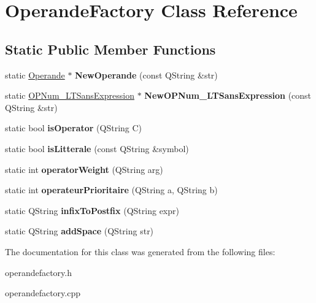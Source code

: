 \hypertarget{class_operande_factory}{}\section{Operande\+Factory Class Reference}
\label{class_operande_factory}
\subsection*{Static Public Member Functions}
\begin{DoxyCompactItemize}
\item 
static \hyperlink{class_operande}{Operande} $\ast$ {\bfseries New\+Operande} (const Q\+String \&str)\hypertarget{class_operande_factory_af20bfb7436b73504423a0b566c6aac5f}{}\label{class_operande_factory_af20bfb7436b73504423a0b566c6aac5f}

\item 
static \hyperlink{class_o_p_num___l_t_sans_expression}{O\+P\+Num\+\_\+\+L\+T\+Sans\+Expression} $\ast$ {\bfseries New\+O\+P\+Num\+\_\+\+L\+T\+Sans\+Expression} (const Q\+String \&str)\hypertarget{class_operande_factory_a6de4539897981c388493689aacacf548}{}\label{class_operande_factory_a6de4539897981c388493689aacacf548}

\item 
static bool {\bfseries is\+Operator} (Q\+String C)\hypertarget{class_operande_factory_ada8645a0a4971ebefcc9c24c761e46c4}{}\label{class_operande_factory_ada8645a0a4971ebefcc9c24c761e46c4}

\item 
static bool {\bfseries is\+Litterale} (const Q\+String \&symbol)\hypertarget{class_operande_factory_a547d3898588342c53951472b17ef9e53}{}\label{class_operande_factory_a547d3898588342c53951472b17ef9e53}

\item 
static int {\bfseries operator\+Weight} (Q\+String arg)\hypertarget{class_operande_factory_a6c3274fddb75b141d2c3ffa759f75358}{}\label{class_operande_factory_a6c3274fddb75b141d2c3ffa759f75358}

\item 
static int {\bfseries operateur\+Prioritaire} (Q\+String a, Q\+String b)\hypertarget{class_operande_factory_a7c418ffcba5c6a92e86784874a32b3e8}{}\label{class_operande_factory_a7c418ffcba5c6a92e86784874a32b3e8}

\item 
static Q\+String {\bfseries infix\+To\+Postfix} (Q\+String expr)\hypertarget{class_operande_factory_aff31ef33868512e10ff05189eb2468a4}{}\label{class_operande_factory_aff31ef33868512e10ff05189eb2468a4}

\item 
static Q\+String {\bfseries add\+Space} (Q\+String str)\hypertarget{class_operande_factory_a0dbc35bda53581379a2aa83f9c36b549}{}\label{class_operande_factory_a0dbc35bda53581379a2aa83f9c36b549}

\end{DoxyCompactItemize}


The documentation for this class was generated from the following files\+:\begin{DoxyCompactItemize}
\item 
operandefactory.\+h\item 
operandefactory.\+cpp\end{DoxyCompactItemize}
